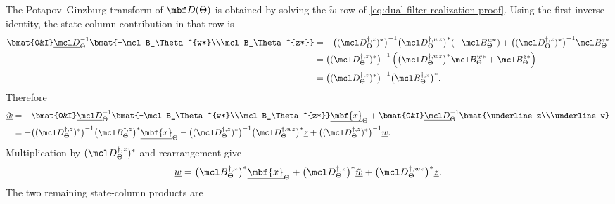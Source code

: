 The Potapov--Ginzburg transform of $\mbf D(\Theta)$ is obtained by
solving the $\tilde{\underline w}$ row of
\eqref{eq:dual-filter-realization-proof}. Using the first inverse identity,
the state-column contribution in that row is
\begin{align*}
\bmat{0&I}\underline{\mcl D}_\Theta^{-1}
\bmat{-\mcl B_\Theta^{w*}\\\mcl B_\Theta^{z*}}
&=
-\bigl((\mcl D_\Theta^{\dagger,z})^*\bigr)^{-1}
\bigl(\mcl D_\Theta^{\dagger,wz}\bigr)^*
(-\mcl B_\Theta^{w*})
+
\bigl((\mcl D_\Theta^{\dagger,z})^*\bigr)^{-1}
\mcl B_\Theta^{z*}\\
&=
\bigl((\mcl D_\Theta^{\dagger,z})^*\bigr)^{-1}
\left(
\bigl(\mcl D_\Theta^{\dagger,wz}\bigr)^*\mcl B_\Theta^{w*}
+\mcl B_\Theta^{z*}
\right)\\
&=
\bigl((\mcl D_\Theta^{\dagger,z})^*\bigr)^{-1}
\bigl(\mcl B_\Theta^{\dagger,z}\bigr)^* .
\end{align*}
Therefore
\begin{align*}
\tilde{\underline w}
&=
-\bmat{0&I}\underline{\mcl D}_\Theta^{-1}
\bmat{-\mcl B_\Theta^{w*}\\\mcl B_\Theta^{z*}}
\underline{\mbf{x}}_\Theta
+
\bmat{0&I}\underline{\mcl D}_\Theta^{-1}
\bmat{\underline z\\\underline w}\\
&=
-\bigl((\mcl D_\Theta^{\dagger,z})^*\bigr)^{-1}
\bigl(\mcl B_\Theta^{\dagger,z}\bigr)^*
\underline{\mbf{x}}_\Theta
-
\bigl((\mcl D_\Theta^{\dagger,z})^*\bigr)^{-1}
\bigl(\mcl D_\Theta^{\dagger,wz}\bigr)^*\underline z
+
\bigl((\mcl D_\Theta^{\dagger,z})^*\bigr)^{-1}\underline w .
\end{align*}
Multiplication by $(\mcl D_\Theta^{\dagger,z})^*$ and rearrangement give
\begin{equation}\label{eq:dual-pg-solve-w}
\underline w
=
\bigl(\mcl B_\Theta^{\dagger,z}\bigr)^*
\underline{\mbf{x}}_\Theta
+
\bigl(\mcl D_\Theta^{\dagger,z}\bigr)^*
\tilde{\underline w}
+
\bigl(\mcl D_\Theta^{\dagger,wz}\bigr)^*\underline z .
\end{equation}
The two remaining state-column products are
